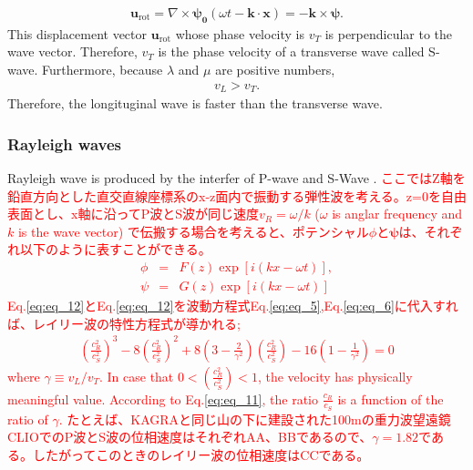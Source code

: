 \begin{eqnarray}
  \bm{u}_{\mathrm{rot}} = \nabla\times{\bm{\psi_{0}}(\omega{t}-\bm{k}\cdot{\bm{x}})} =-\bm{k}\times{\bm{\psi}}.
\end{eqnarray}
This displacement vector $\bm{u}_{\mathrm{rot}}$ whose phase velocity is $v_{T}$ is perpendicular to the wave vector. Therefore, $v_{T}$ is the phase velocity of a transverse wave called S-wave. Furthermore, because  $\lambda$ and $\mu$ are positive numbers, 
\begin{eqnarray}
  v_{L} > v_{T}.\label{eq:eq_10}
\end{eqnarray}
Therefore, the longituginal wave is faster than the transverse wave.



\subsubsection{Rayleigh waves}
Rayleigh wave is produced by the interfer of P-wave and S-Wave \cite{hasegawa2015jishin}. \textcolor{red}{ここではZ軸を鉛直方向とした直交直線座標系のx-z面内で振動する弾性波を考える。z=0を自由表面とし、x軸に沿ってP波とS波が同じ速度$v_{R}=\omega/k$ ($\omega$ is anglar frequency and $k$ is the wave vector) で伝搬する場合を考えると、ポテンシャル$\phi$と$\bm{\psi}$は、それぞれ以下のように表すことができる。
\begin{eqnarray}
  \phi &=& F(z)\exp[i(kx-\omega{t})],\label{eq:eq_12}\\
  \psi &=& G(z)\exp[i(kx-\omega{t})]\label{eq:eq_13}
\end{eqnarray}
Eq.\ref{eq:eq_12}とEq.\ref{eq:eq_12}を波動方程式Eq.\ref{eq:eq_5},Eq.\ref{eq:eq_6}に代入すれば、レイリー波の特性方程式が導かれる;
\begin{eqnarray}\label{eq:eq_11}
\left(\frac{c_{R}^{2}}{c_{S}^{2}}\right)^{3}-8\left(\frac{c_{R}^{2}}{c_{S}^{2}}\right)^{2}+8\left(3-\frac{2}{\gamma^2}\right)\left(\frac{c_{R}^{2}}{c_{S}^{2}}\right)-16\left(1-\frac{1}{\gamma^2}\right)=0
\end{eqnarray}
where $\gamma\equiv v_{L}/v_{T}$. In case that $0 < (\frac{c_{R}^2}{c_{S}^2}) <1$, the velocity has physically meaningful value. According to Eq.\ref{eq:eq_11}, the ratio $\frac{c_R}{c_S}$ is a function of the ratio of $\gamma$. たとえば、KAGRAと同じ山の下に建設された100mの重力波望遠鏡CLIOでのP波とS波の位相速度はそれぞれAA、BBである\cite{takemoto2003}ので、$\gamma = 1.82 $である。したがってこのときのレイリー波の位相速度はCCである。
}



